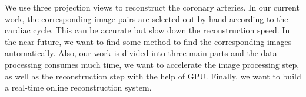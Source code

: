We use three projection views to reconstruct the coronary arteries. In our
current work, the corresponding image pairs are selected out by hand
according to the cardiac cycle. This can be accurate but slow down the
reconstruction speed. In the near future, we want to find some method to
find the corresponding images automatically. Also, our work is divided into
three main parts and the data processing consumes much time, we want to
accelerate the image processing step, as well as the reconstruction step
with the help of GPU. Finally, we want to build a real-time online
reconstruction system. 

